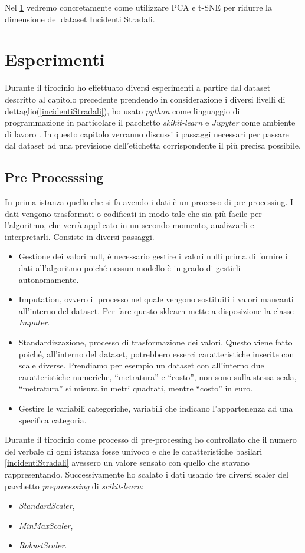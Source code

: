 \documentclass[12pt,italian]{report}
\begin{document}
Nel \ref{cap3} vedremo concretamente come utilizzare PCA e t-SNE per ridurre la dimensione del dataset Incidenti Stradali.



% 
% 

\chapter{Esperimenti}
\label{cap3}
Durante il tirocinio ho effettuato diversi esperimenti a partire dal dataset descritto al capitolo precedente prendendo in considerazione i diversi livelli di dettaglio(\ref{incidentiStradali}), ho usato \emph{python} come linguaggio di programmazione in particolare il pacchetto \emph{skikit-learn} \cite{scikit-learn} e \emph{Jupyter} come ambiente di lavoro \cite{jupyter}.
In questo capitolo verranno discussi i passaggi necessari per passare dal dataset ad una previsione dell'etichetta corrispondente il più precisa possibile.
\section{Pre Processsing}
\label{preprocessing}
In prima istanza quello che si fa avendo i dati è un processo di pre processing. I dati vengono trasformati o codificati in modo tale che sia più facile per l'algoritmo, che verrà applicato in un secondo momento,  analizzarli e interpretarli.
Consiste in diversi passaggi.
\begin{itemize}
	\item Gestione dei valori null, è necessario gestire i valori nulli prima di fornire i dati all'algoritmo poiché nessun modello è in grado di gestirli autonomamente.
	\item Imputation, ovvero il processo nel quale vengono sostituiti i valori mancanti all'interno del dataset. Per fare questo sklearn mette a disposizione la classe \emph{Imputer}.
	\item Standardizzazione, processo di trasformazione dei valori. Questo viene fatto poiché, all'interno del dataset, potrebbero esserci caratteristiche inserite con scale diverse. Prendiamo per esempio un dataset con all'interno due caratteristiche numeriche, ``metratura'' e ``costo'', non sono sulla stessa scala, ``metratura'' si misura in metri quadrati, mentre ``costo'' in euro. 
	\item Gestire le variabili categoriche, variabili che indicano l'appartenenza ad una specifica categoria.
\end{itemize}
Durante il tirocinio come processo di pre-processing ho controllato che il numero del verbale di ogni istanza fosse univoco e che le caratteristiche basilari \ref{incidentiStradali} avessero un valore sensato con quello che stavano rappresentando. Successivamente ho scalato i dati usando tre diversi scaler del pacchetto \emph{preprocessing} di \emph{scikit-learn}:
\begin{itemize}
	\item \emph{StandardScaler},
	\item \emph{MinMaxScaler},
	\item \emph{RobustScaler}.
\end{itemize} 
\end{document}
